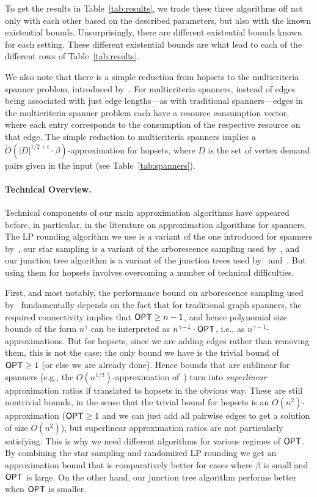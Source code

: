 \documentclass{article}
\theoremstyle{definition}
\theoremstyle{remark}
\def\opt {{\sf OPT}}
\begin{document}
To get the results in Table~\ref{tab:results}, we trade these three algorithms off not only with each other based on the described parameters, but also with the known existential bounds.  Unsurprisingly, there are different existential bounds known for each setting.  These different existential bounds are what lead to each of the different rows of Table~\ref{tab:results}.

We also note that there is a simple reduction from hopsets to the multicriteria spanner problem, introduced by~\cite{GKL24}. For multicriteria spanners, instead of edges being associated with just edge lengths---as with traditional spanners---edges in the multicriteria spanner problem each have a resource consumption vector, where each entry corresponds to the consumption of the respective resource on that edge. The simple reduction to multicriteria spanners implies a $\widetilde{O}(|D|^{1/2 + \epsilon} \cdot \beta)$-approximation for hopsets, where $D$ is the set of vertex demand pairs given in the input (see Table~\ref{tab:spanners}).  

\paragraph{Technical Overview.}  Technical components of our main approximation algorithms have appeared before, in particular, in the literature on approximation algorithms for spanners.  The LP rounding algorithm we use is a variant of the one introduced for spanners by~\cite{BBMRY11}, our star sampling is a variant of the arborescence sampling used by~\cite{DK11}, and our junction tree algorithm is a variant of the junction trees used by~\cite{CDKL20} and~\cite{GKL23}.  But using them for hopsets involves overcoming a number of technical difficulties.

First, and most notably, the performance bound on arborescence sampling used by~\cite{DK11,BBMRY11} fundamentally depends on the fact that for traditional graph spanners, the required connectivity implies that $\opt \geq n-1$, and hence polynomial size bounds of the form $n^{\gamma}$ can be interpreted as $n^{\gamma-1} \cdot \opt$, i.e., as $n^{\gamma -1 }$-approximations.  But for hopsets, since we are adding edges rather than removing them, this is not the case: the only bound we have is the trivial bound of $\opt \geq 1$ (or else we are already done).  Hence bounds that are sublinear for spanners (e.g., the $O(n^{1/2})$-approximation of~\cite{BBMRY11}) turn into \emph{superlinear} approximation ratios if translated to hopsets in the obvious way.  These are still nontrivial bounds, in the sense that the trivial bound for hopsets is an $O(n^2)$-approximation  ($\opt \geq 1$ and we can just add all pairwise edges to get a solution of size $O(n^2)$), but superlinear approximation ratios are not particularly satisfying. This is why we need different algorithms for various regimes of $\opt$.
By combining the star sampling and randomized LP rounding we get an approximation bound that is comparatively better for cases where $\beta$ is small and $\opt$ is large. On the other hand, our junction tree algorithm performs better when $\opt$ is smaller.  
\end{document}
